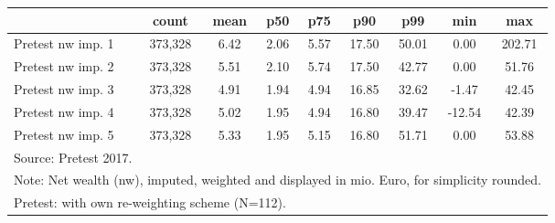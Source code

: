 {
\def\sym#1{\ifmmode^{#1}\else\(^{#1}\)\fi}
\begin{tabular}{l*{1}{cccccccc}}
\hline\hline
                                            &       count&        mean&         p50&         p75&         p90&         p99&         min&         max\\
\hline
Pretest nw imp. 1                           &     373,328&        6.42&        2.06&        5.57&       17.50&       50.01&        0.00&      202.71\\
Pretest nw imp. 2                           &     373,328&        5.51&        2.10&        5.74&       17.50&       42.77&        0.00&       51.76\\
Pretest nw imp. 3                           &     373,328&        4.91&        1.94&        4.94&       16.85&       32.62&       -1.47&       42.45\\
Pretest nw imp. 4                           &     373,328&        5.02&        1.95&        4.94&       16.80&       39.47&      -12.54&       42.39\\
Pretest nw imp. 5                           &     373,328&        5.33&        1.95&        5.15&       16.80&       51.71&        0.00&       53.88\\
\hline\hline
\multicolumn{9}{l}{\footnotesize Source: Pretest 2017.}\\
\multicolumn{9}{l}{\footnotesize Note: Net wealth (nw), imputed, weighted and displayed in mio. Euro, for simplicity rounded.}\\
\multicolumn{9}{l}{\footnotesize Pretest: with own re-weighting scheme (N=112).}\\
\end{tabular}
}
